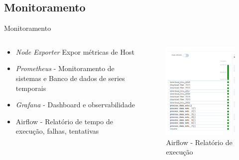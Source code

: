 \documentclass[10pt,brazil]{beamer}
\theoremstyle{definition}
\begin{document}
\subsection{Monitoramento}

\begin{frame}{Monitoramento}
    \begin{columns}
      \begin{column}{0.5\textwidth}
  \begin{itemize}
    \item \emph{Node Exporter} Expor métricas de Host
    \item \emph{Prometheus} -  Monitoramento de sistemas e Banco de dados de series temporais
    \item \emph{Grafana} - Dashboard e observabilidade
    \item Airflow - Relatório de tempo de execução, falhas, tentativas
  \end{itemize}
\end{column}
\begin{column}{0.5\textwidth}
  \begin{center}
    \begin{figure}
      \centering
      \includegraphics[width=.9\textwidth]{report_execution_summary.png}
      \caption{Airflow - Relatório de execução}
    \end{figure}
  \end{center}
\end{column}
\end{columns}
\end{frame}
\end{document}
